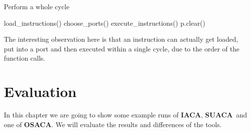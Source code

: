 \documentclass[a4paper,12pt,titlepage, twoside]{report}
\newcommand{\suaca}{\textbf{SUACA}}
\newcommand{\iaca}{\textbf{IACA}}
\newcommand{\osaca}{\textbf{OSACA}}
\begin{document}
\begin{algorithm}[H]
    \SetAlgoLined
    \caption{Perform a whole cycle}
    load\_instructions()\;
    choose\_ports()\;
    execute\_instructions()\;
     {
        p.clear()\;
    }
\end{algorithm}

The interesting observation here is that an instruction can actually get loaded, put into a port and then executed within a single cycle, due to the order of the function calls.



\chapter{Evaluation}
\label{chap:eval}

In this chapter we are going to show some example runs of \iaca, \suaca\ and one of \osaca. We will evaluate the results and differences of the tools.





%
\printbibliography
\end{document}
